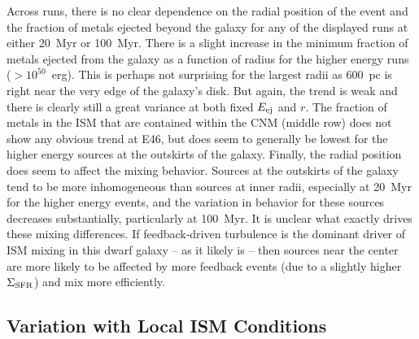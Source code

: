Across runs, there is no clear dependence on the radial position of the event and the fraction of metals ejected beyond the galaxy for any of the displayed runs at either 20~Myr or 100~Myr. There is a slight increase in the minimum fraction of metals ejected from the galaxy as a function of radius for the higher energy runs ($>10^{50}$~erg). This is perhaps not surprising for the largest radii as 600~pc is right near the very edge of the galaxy's disk. But again, the trend is weak and there is clearly still a great variance at both fixed $E_{\rm ej}$ and $r$. The fraction of metals in the ISM that are contained within the CNM (middle row) does not show any obvious trend at E46, but does seem to generally be lowest for the higher energy sources at the outskirts of the galaxy. Finally, the radial position does seem to affect the mixing behavior. Sources at the outskirts of the galaxy tend to be more inhomogeneous than sources at inner radii, especially at 20~Myr for the higher energy events, and the variation in behavior for these sources decreases substantially, particularly at 100~Myr. It is unclear what exactly drives these mixing differences. If feedback-driven turbulence is the dominant driver of ISM mixing in this dwarf galaxy -- as it likely is -- then sources near the center are more likely to be affected by more feedback events (due to a slightly higher $\Sigma_{\rm SFR}$) and mix more efficiently.

\subsection{Variation with Local ISM Conditions}
\label{ch4:sec:ISM density}

